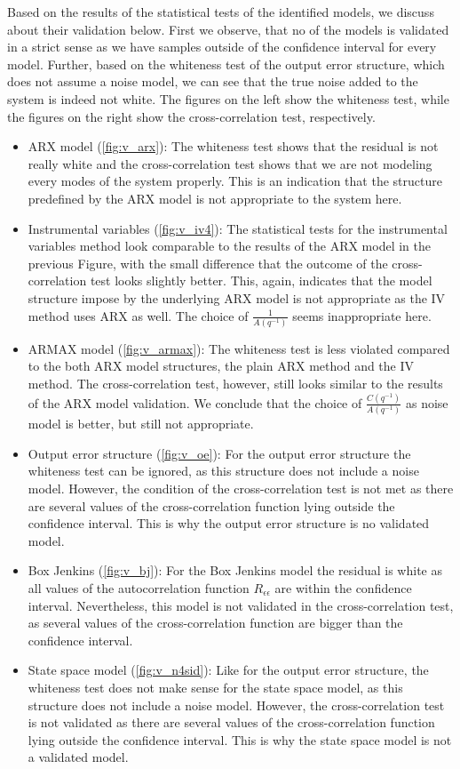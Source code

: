 \noindent Based on the results of the statistical tests of the identified models, we discuss about their validation below.
First we observe, that no of the models is validated in a strict sense as we have samples outside of the confidence interval for every model.
Further, based on the whiteness test of the output error structure, which does not assume a noise model, we can see that the true noise added to the system is indeed not white.
The figures on the left show the whiteness test, while the figures on the right show the cross-correlation test, respectively.
\begin{itemize}
\item{ARX model (\ref{fig:v_arx}): } The whiteness test shows that the residual is not really white and the cross-correlation test shows that we are not modeling every modes of the system properly. This is an indication that the structure predefined by the ARX model is not appropriate to the system here.
\item{Instrumental variables (\ref{fig:v_iv4}): } The statistical tests for the instrumental variables method look comparable to the results of the ARX model in the previous Figure, with the small difference that the outcome of the cross-correlation test looks slightly better. This, again, indicates that the model structure impose by the underlying ARX model is not appropriate as the IV method uses ARX as well. The choice of $\frac{1}{A(q^{-1})}$ seems inappropriate here.
\item{ARMAX model (\ref{fig:v_armax}): } The whiteness test is less violated compared to the both ARX model structures, the plain ARX method and the IV method. The cross-correlation test, however, still looks similar to the results of the ARX model validation. We conclude that the choice of $\frac{C(q^{-1})}{A(q^{-1})}$ as noise model is better, but still not appropriate.
\item{Output error structure (\ref{fig:v_oe}): } For the output error structure the whiteness test can be ignored, as this structure does not include a noise model. However, the condition of the cross-correlation test is not met as there are several values of the cross-correlation function lying outside the confidence interval. This is why the output error structure is no validated model. 
\item{Box Jenkins (\ref{fig:v_bj}): } For the Box Jenkins model the residual is white as all values of the autocorrelation function $R_{\epsilon \epsilon}$ are within the confidence interval. Nevertheless, this model is not validated in the cross-correlation test, as several values of the cross-correlation function are bigger than the confidence interval.
\item{State space model (\ref{fig:v_n4sid}): } Like for the output error structure, the whiteness test does not make sense for the state space model, as this structure does not include a noise model. However, the cross-correlation test is not validated as there are several values of the cross-correlation function lying outside the confidence interval. This is why the state space model is not a validated model.
\end{itemize}


